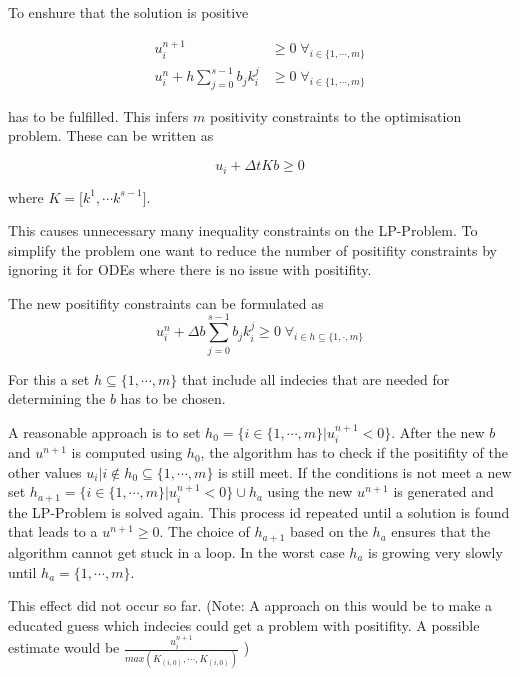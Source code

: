 \documentclass{article}
\begin{document}
To enshure that the solution is positive 

\begin{align}
 u_i^{n+1} &\geq 0   \;   \forall_{i \in \{1, \cdots,m \}}  \\
 u_i^n + h \sum_{j=0}^{s-1} b_j k_i^j  &\geq 0   \;   \forall_{i \in \{1,\cdots,m \}}  
\end{align}

has to be fulfilled.
This infers $m$ positivity constraints to the optimisation problem. These can be written as

\begin{equation}
u_i + \Delta t K  b \geq 0     
\end{equation}

where $K = \big[k^1 , \cdots k^{s-1}\big]$.

This causes unnecessary many inequality constraints on the LP-Problem. To simplify the problem one want to reduce the number of positifity constraints by ignoring it for ODEs where there is no issue with positifity.

The new positifity constraints can be formulated as
\begin{equation}
u_i^n + \Delta b \sum_{j=0}^{s-1} b_j k_i^j  \geq 0   \;   \forall_{i \in h \subseteq \{1,\cdot,m \}} 
\end{equation}

For this a set $h \subseteq \{1,\cdots,m \}$ that include all indecies that are needed for determining the $b$ has to be chosen.

A reasonable approach is to set $h_0 = \{ i \in \{1,\cdots,m \} |  u_i^{n+1}  < 0 \}$. 
After the new $b$ and $u^{n+1}$ is computed using $h_0$, the algorithm has to check if the positifity of the other values $u_i | i \notin h_0 \subseteq \{1,\cdots,m \}$ is still meet. 
If the conditions is not meet a new set $h_{a+1} = \{ i \in \{1,\cdots,m \}|  u_i^{n+1}  < 0 \} \cup h_{a}$ using the new $u^{n+1}$ is generated and the LP-Problem is solved again. This process id repeated until a solution is found that leads to a $u^{n+1} \geq 0$. The choice of $h_{a+1}$ based on the $h_{a}$ ensures that the algorithm cannot get stuck in a loop. In the worst case $h_a$ is growing very slowly until $h_a = \{1,\cdots,m \}$. 

This effect did not occur so far. 
(Note: A approach on this would be to make a educated guess which indecies could get a problem with positifity. A possible estimate would be $\frac{u_i^{n+1}}{max(K_{(i,0)}, \cdots ,K_{(i,0)})} $ )
\end{document}

